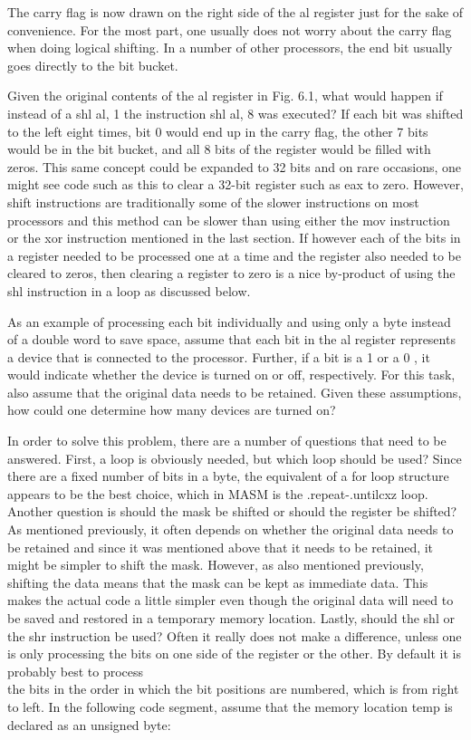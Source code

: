 \documentclass[10pt]{book}
\begin{document}
The carry flag is now drawn on the right side of the al register just for the sake of convenience. For the most part, one usually does not worry about the carry flag when doing logical shifting. In a number of other processors, the end bit usually goes directly to the bit bucket.

Given the original contents of the al register in Fig. 6.1, what would happen if instead of a shl al, 1 the instruction shl al, 8 was executed? If each bit was shifted to the left eight times, bit 0 would end up in the carry flag, the other 7 bits would be in the bit bucket, and all 8 bits of the register would be filled with zeros. This same concept could be expanded to 32 bits and on rare occasions, one might see code such as this to clear a 32-bit register such as eax to zero. However, shift instructions are traditionally some of the slower instructions on most processors and this method can be slower than using either the mov instruction or the xor instruction mentioned in the last section. If however each of the bits in a register needed to be processed one at a time and the register also needed to be cleared to zeros, then clearing a register to zero is a nice by-product of using the shl instruction in a loop as discussed below.

As an example of processing each bit individually and using only a byte instead of a double word to save space, assume that each bit in the al register represents a device that is connected to the processor. Further, if a bit is a 1 or a 0 , it would indicate whether the device is turned on or off, respectively. For this task, also assume that the original data needs to be retained. Given these assumptions, how could one determine how many devices are turned on?

In order to solve this problem, there are a number of questions that need to be answered. First, a loop is obviously needed, but which loop should be used? Since there are a fixed number of bits in a byte, the equivalent of a for loop structure appears to be the best choice, which in MASM is the .repeat-.untilcxz loop. Another question is should the mask be shifted or should the register be shifted? As mentioned previously, it often depends on whether the original data needs to be retained and since it was mentioned above that it needs to be retained, it might be simpler to shift the mask. However, as also mentioned previously, shifting the data means that the mask can be kept as immediate data. This makes the actual code a little simpler even though the original data will need to be saved and restored in a temporary memory location. Lastly, should the shl or the shr instruction be used? Often it really does not make a difference, unless one is only processing the bits on one side of the register or the other. By default it is probably best to process\\
the bits in the order in which the bit positions are numbered, which is from right to left. In the following code segment, assume that the memory location temp is declared as an unsigned byte:
\end{document}
